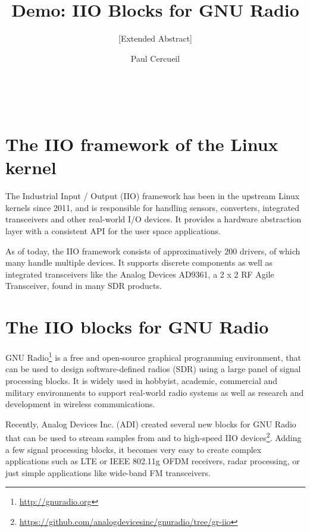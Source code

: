 \documentclass{acm_proc_article-sp}
\begin{document}
\title{Demo: IIO Blocks for GNU Radio}
\subtitle{[Extended Abstract]}


\author{
\alignauthor
Paul Cercueil\\
	\\
	\\
	\\
}

\maketitle


\section{The IIO framework of the Linux kernel}

The Industrial Input / Output (IIO) framework has been in
the upstream Linux kernels since 2011, and is responsible for handling sensors,
converters, integrated transceivers and other real-world I/O devices. It provides
a hardware abstraction layer with a consistent API for the user space
applications.

As of today, the IIO framework consists of approximatively 200 drivers,
of which many handle multiple devices.
It supports discrete components as well as
integrated transceivers like the Analog Devices AD9361, a 2 x 2 RF Agile Transceiver, found in many SDR products.

\section{The IIO blocks for GNU Radio}

GNU Radio\footnote{\url{http://gnuradio.org}}
is a free and open-source graphical programming environment, that can
be used to design software-defined radios (SDR) using a large panel of signal
processing blocks. It is widely used in hobbyist, academic, commercial and
military environments to support real-world radio systems as well as research
and development in wireless communications.

Recently, Analog Devices Inc. (ADI) created several new blocks for GNU Radio
that can be used to stream samples from and to high-speed IIO
devices\footnote{\url{https://github.com/analogdevicesinc/gnuradio/tree/gr-iio}}.
Adding a few signal processing
blocks, it becomes very easy to create complex applications such as
LTE or IEEE 802.11g OFDM receivers, radar processing, or just simple
applications like wide-band FM transceivers.
\end{document}
